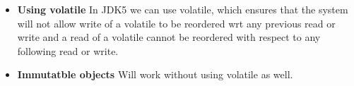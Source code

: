 \documentclass[11pt]{article}
\begin{document}
\begin{enumerate}
\begin{minipage}{\minpagw}
{{\begin{itemize}
          \item \textbf{Using volatile} In JDK5 we can use volatile, which ensures that the system will not allow write of a volatile to be reordered wrt any previous read or write and a read of a volatile cannot be reordered with respect to any following read or write. 
          \item \textbf{Immutatble objects} Will work without using volatile as well.
      \end{itemize}
    }%
  }%
\end{minipage}    


\end{enumerate}
\end{document}
